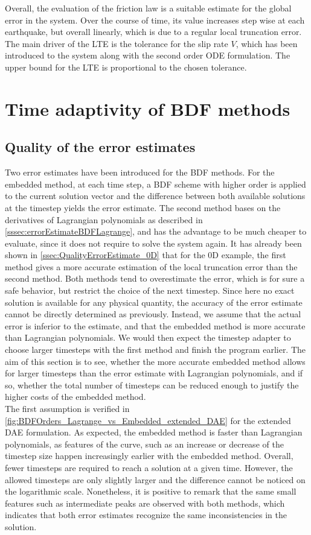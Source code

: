 Overall, the evaluation of the friction law is a suitable estimate for the global error in the system. Over the course of time, its value increases step wise at each earthquake, but overall linearly, which is due to a regular local truncation error. The main driver of the LTE is the tolerance for the slip rate $V$, which has been introduced to the system along with the second order ODE formulation. The upper bound for the LTE is proportional to the chosen tolerance.


\section{Time adaptivity of BDF methods}
\label{sec:Results_BDFOrder}
\subsection{Quality of the error estimates}
Two error estimates have been introduced for the BDF methods. For the embedded method, at each time step, a BDF scheme with higher order is applied to the current solution vector and the difference between both available solutions at the timestep yields the error estimate. The second method bases on the derivatives of Lagrangian polynomials as described in \autoref{sssec:errorEstimateBDFLagrange}, and has the advantage to be much cheaper to evaluate, since it does not require to solve the system again. It has already been shown in \autoref{ssec:QualityErrorEstimate_0D} that for the 0D example, the first method gives a more accurate estimation of the local truncation error than the second method. Both methods tend to overestimate the error, which is for sure a safe behavior, but restrict the choice of the next timestep. Since here no exact solution is available for any physical quantity, the accuracy of the error estimate cannot be directly determined as previously. Instead, we assume that the actual error is inferior to the estimate, and that the embedded method is more accurate than Lagrangian polynomials. We would then expect the timestep adapter to choose larger timesteps with the first method and finish the program earlier. The aim of this section is to see, whether the more accurate embedded method allows for larger timesteps than the error estimate with Lagrangian polynomials, and if so, whether the total number of timesteps can be reduced enough to justify the higher costs of the embedded method. \\
The first assumption is verified in \autoref{fig:BDFOrders_Lagrange_vs_Embedded_extended_DAE} for the extended DAE formulation. As expected, the embedded method is faster than Lagrangian polynomials, as features of the curve, such as an increase or decrease of the timestep size happen increasingly earlier with the embedded method. Overall, fewer timesteps are required to reach a solution at a given time. However, the allowed timesteps are only slightly larger and the difference cannot be noticed on the logarithmic scale. Nonetheless, it is positive to remark that the same small features such as intermediate peaks are observed with both methods, which indicates that both error estimates recognize the same inconsistencies in the solution. 
